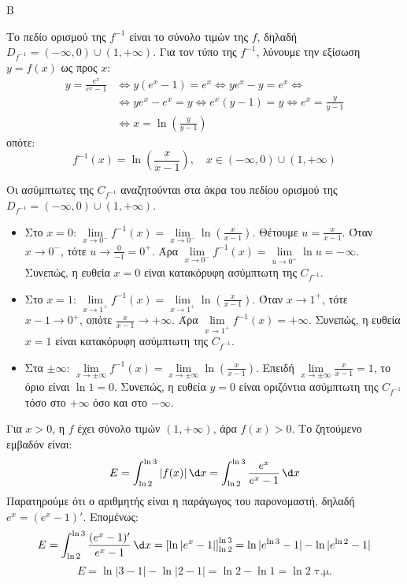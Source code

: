 \begin{thema}{Β}
\begin{erwthma}
Το πεδίο ορισμού της $f^{-1}$ είναι το σύνολο τιμών της $f$, δηλαδή $D_{f^{-1}} = (-\infty, 0) \cup (1, +\infty)$.
Για τον τύπο της $f^{-1}$, λύνουμε την εξίσωση $y = f(x)$ ως προς $x$:
\begin{align*}
y = \frac{e^x}{e^x-1} &\Leftrightarrow y(e^x-1) = e^x \Leftrightarrow y e^x - y = e^x \Leftrightarrow \\&\Leftrightarrow y e^x - e^x = y \Leftrightarrow e^x(y-1) = y \Leftrightarrow e^x = \frac{y}{y-1}\\&\Leftrightarrow
x = \ln \left( \frac{y}{y-1} \right)
\end{align*}
οπότε:
\[ f^{-1}(x) = \ln \left( \frac{x}{x-1} \right), \quad x \in (-\infty, 0) \cup (1, +\infty) \]

\item Οι ασύμπτωτες της $C_{f^{-1}}$ αναζητούνται στα άκρα του πεδίου ορισμού της $D_{f^{-1}} = (-\infty, 0) \cup (1, +\infty)$.
\begin{itemize}
    \item Στο $x=0$: $\lim\limits_{x \to 0^-} f^{-1}(x) = \lim\limits_{x \to 0^-} \ln \left( \frac{x}{x-1} \right)$.
    Θέτουμε $u = \frac{x}{x-1}$. Όταν $x \to 0^-$, τότε $u \to \frac{0}{-1} = 0^+$.
    Άρα $\lim\limits_{x \to 0^-} f^{-1}(x) = \lim\limits_{u \to 0^+} \ln u = -\infty$.
    Συνεπώς, η ευθεία $x=0$ είναι κατακόρυφη ασύμπτωτη της $C_{f^{-1}}$.
    \item Στο $x=1$: $\lim\limits_{x \to 1^+} f^{-1}(x) = \lim\limits_{x \to 1^+} \ln \left( \frac{x}{x-1} \right)$.
    Όταν $x \to 1^+$, τότε $x-1 \to 0^+$, οπότε $\frac{x}{x-1} \to +\infty$.
    Άρα $\lim\limits_{x \to 1^+} f^{-1}(x) = +\infty$.
    Συνεπώς, η ευθεία $x=1$ είναι κατακόρυφη ασύμπτωτη της $C_{f^{-1}}$.
    \item Στα $\pm\infty$: $\lim\limits_{x \to \pm\infty} f^{-1}(x) = \lim\limits_{x \to \pm\infty} \ln \left( \frac{x}{x-1} \right)$.
    Επειδή $\lim\limits_{x \to \pm\infty} \frac{x}{x-1} = 1$, το όριο είναι $\ln 1 = 0$.
    Συνεπώς, η ευθεία $y=0$ είναι οριζόντια ασύμπτωτη της $C_{f^{-1}}$ τόσο στο $+\infty$ όσο και στο $-\infty$.
\end{itemize}

\item Για $x > 0$, η $f$ έχει σύνολο τιμών $(1, +\infty)$, άρα $f(x) > 0$.
Το ζητούμενο εμβαδόν είναι:
\[ E = \int_{\ln 2}^{\ln 3} |f(x)|\,\d x = \int_{\ln 2}^{\ln 3} \frac{e^x}{e^x-1}\,\d x \]
Παρατηρούμε ότι ο αριθμητής είναι η παράγωγος του παρονομαστή, δηλαδή $e^x = (e^x-1)'$.
Επομένως:
\[ E = \int_{\ln 2}^{\ln 3} \frac{(e^x-1)'}{e^x-1}\,\d x = \left[ \ln|e^x-1| \right]_{\ln 2}^{\ln 3} = \ln|e^{\ln 3}-1| - \ln|e^{\ln 2}-1| \]
\[ E = \ln|3-1| - \ln|2-1| = \ln 2 - \ln 1 = \ln 2 \text{ τ.μ.} \]
\end{erwthma}
\end{thema}

